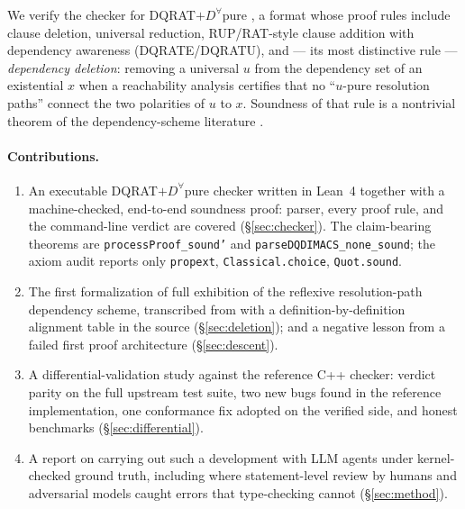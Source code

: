\documentclass{article}
\begin{document}
We verify the checker for DQRAT$+D^{\forall}$pure \cite{dqratcheck}, a format
whose proof rules include clause deletion, universal reduction, RUP/RAT-style
clause addition with dependency awareness (DQRATE/DQRATU), and --- its most
distinctive rule --- \emph{dependency deletion}: removing a universal $u$ from
the dependency set of an existential $x$ when a reachability analysis certifies
that no ``$u$-pure resolution paths'' connect the two polarities of $u$ to $x$.
Soundness of that rule is a nontrivial theorem of the dependency-scheme
literature \cite{WimmerWimmerSchollBecker2016,
BeyersdorffBlinkhornChewSchmidtSuda2019,VanGelder2011,SlivovskySzeider2012}.

\paragraph{Contributions.}
\begin{enumerate}
\item An executable DQRAT$+D^{\forall}$pure checker written in Lean~4 together
  with a machine-checked, end-to-end soundness proof: parser, every proof
  rule, and the command-line verdict are covered
  (\S\ref{sec:checker}). The claim-bearing theorems are
  \texttt{processProof\_sound'} and \texttt{parseDQDIMACS\_none\_sound}; the
  axiom audit reports only \texttt{propext}, \texttt{Classical.choice},
  \texttt{Quot.sound}.
\item The first formalization of full exhibition of the reflexive
  resolution-path dependency scheme, transcribed from
  \cite{BeyersdorffBlinkhornChewSchmidtSuda2019} with a
  definition-by-definition alignment table in the source
  (\S\ref{sec:deletion}); and a negative lesson from a failed first proof
  architecture (\S\ref{sec:descent}).
\item A differential-validation study against the reference C++ checker:
  verdict parity on the full upstream test suite, two new bugs found in the
  reference implementation, one conformance fix adopted on the verified side,
  and honest benchmarks (\S\ref{sec:differential}).
\item A report on carrying out such a development with LLM agents under
  kernel-checked ground truth, including where statement-level review by
  humans and adversarial models caught errors that type-checking cannot
  (\S\ref{sec:method}).
\end{enumerate}
\end{document}
